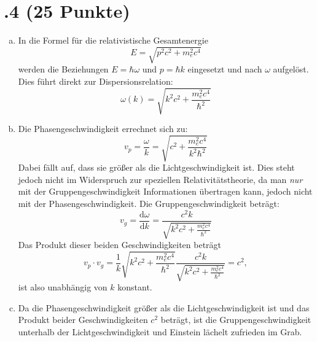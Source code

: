\section*{\nr.4 \titfour (25 Punkte)}
\begin{enumerate}[(a)]
\item In die Formel für die relativistische Gesamtenergie
\begin{equation}
E = \sqrt{p^2c^2+m_e^2c^4}
\end{equation}
werden die Beziehungen $E=\hbar \omega$ und $p= \hbar k$ eingesetzt und nach $\omega$ aufgelöst. Dies führt direkt zur Dispersionsrelation:
\begin{equation}
\omega(k) = \sqrt{k^2c^2+\frac{m_e^2c^4}{\hbar^2}}
\end{equation}
\item Die Phasengeschwindigkeit errechnet sich zu:
\begin{equation}
v_p = \frac{\omega}{k} = \sqrt{c^2+\frac{m_e^2c^4}{k^2\hbar^2}}
\end{equation}
Dabei fällt auf, dass sie größer als die Lichtgeschwindigkeit ist. Dies steht jedoch nicht im Widerspruch zur speziellen Relativitätstheorie, da man \emph{nur} mit der Gruppengeschwindigkeit Informationen übertragen kann, jedoch nicht mit der Phasengeschwindigkeit. Die Gruppengeschwindigkeit beträgt:
\begin{equation}
v_g = \frac{\mathrm{d}\omega}{\mathrm{d}k} = \frac{c^2 k}{\sqrt{k^2c^2+\frac{m_e^2c^4}{\hbar^2}}}
\end{equation}
Das Produkt dieser beiden Geschwindigkeiten beträgt
\begin{equation}
v_p\cdot v_g = \frac{1}{k}\sqrt{k^2c^2+\frac{m_e^2c^4}{\hbar^2}} \frac{c^2 k}{\sqrt{k^2c^2+\frac{m_e^2c^4}{\hbar^2}}} = c^2,
\end{equation}
ist also unabhängig von $k$ konstant.
\item Da die Phasengeschwindigkeit größer als die Lichtgeschwindigkeit ist und das Produkt beider Geschwindigkeiten $c^2$ beträgt, ist die Gruppengeschwindigkeit unterhalb der Lichtgeschwindigkeit und Einstein lächelt zufrieden im Grab.
\end{enumerate}